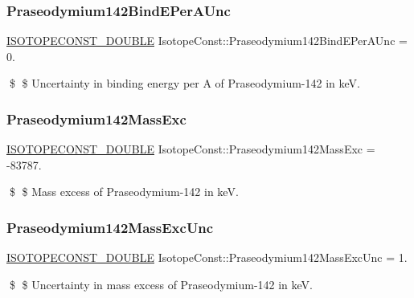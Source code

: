 \subsubsection{\texorpdfstring{Praseodymium142\+Bind\+E\+Per\+A\+Unc}{Praseodymium142BindEPerAUnc}}
{\footnotesize\ttfamily \mbox{\hyperlink{group___isotope_const-_macros_ga8f45a7272ce02c0b4c65c44636ed719a}{I\+S\+O\+T\+O\+P\+E\+C\+O\+N\+S\+T\+\_\+\+D\+O\+U\+B\+LE}} Isotope\+Const\+::\+Praseodymium142\+Bind\+E\+Per\+A\+Unc = 0.}

\$ \$ Uncertainty in binding energy per A of Praseodymium-\/142 in keV. \mbox{\label{group___isotope_const-_praseodymium-_pr142_gafdf2941940642e96bff48a0768954ca9}} 
\subsubsection{\texorpdfstring{Praseodymium142\+Mass\+Exc}{Praseodymium142MassExc}}
{\footnotesize\ttfamily \mbox{\hyperlink{group___isotope_const-_macros_ga8f45a7272ce02c0b4c65c44636ed719a}{I\+S\+O\+T\+O\+P\+E\+C\+O\+N\+S\+T\+\_\+\+D\+O\+U\+B\+LE}} Isotope\+Const\+::\+Praseodymium142\+Mass\+Exc = -\/83787.}

\$ \$ Mass excess of Praseodymium-\/142 in keV. \mbox{\label{group___isotope_const-_praseodymium-_pr142_gaeeedd57e29a9d7f773ad54618aef5bca}} 
\subsubsection{\texorpdfstring{Praseodymium142\+Mass\+Exc\+Unc}{Praseodymium142MassExcUnc}}
{\footnotesize\ttfamily \mbox{\hyperlink{group___isotope_const-_macros_ga8f45a7272ce02c0b4c65c44636ed719a}{I\+S\+O\+T\+O\+P\+E\+C\+O\+N\+S\+T\+\_\+\+D\+O\+U\+B\+LE}} Isotope\+Const\+::\+Praseodymium142\+Mass\+Exc\+Unc = 1.}

\$ \$ Uncertainty in mass excess of Praseodymium-\/142 in keV. \mbox{\label{group___isotope_const-_praseodymium-_pr142_ga869d62e82799e0f4d3193ba283ce26ea}} 

